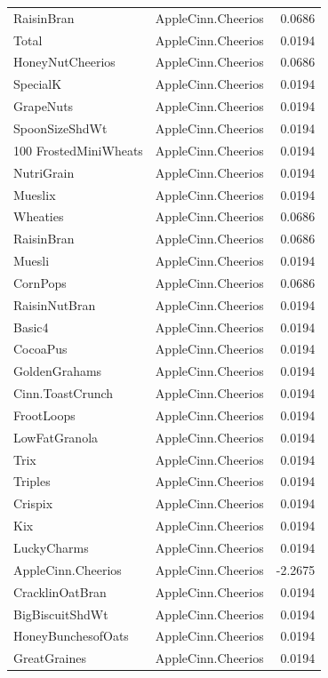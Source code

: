 \begin{longtable}{llr}
RaisinBran & AppleCinn.Cheerios & 0.0686 \\
Total & AppleCinn.Cheerios & 0.0194 \\
HoneyNutCheerios & AppleCinn.Cheerios & 0.0686 \\
SpecialK & AppleCinn.Cheerios & 0.0194 \\
GrapeNuts & AppleCinn.Cheerios & 0.0194 \\
SpoonSizeShdWt & AppleCinn.Cheerios & 0.0194 \\
100%
FrostedMiniWheats & AppleCinn.Cheerios & 0.0194 \\
NutriGrain & AppleCinn.Cheerios & 0.0194 \\
Mueslix & AppleCinn.Cheerios & 0.0194 \\
Wheaties & AppleCinn.Cheerios & 0.0686 \\
RaisinBran & AppleCinn.Cheerios & 0.0686 \\
Muesli & AppleCinn.Cheerios & 0.0194 \\
CornPops & AppleCinn.Cheerios & 0.0686 \\
RaisinNutBran & AppleCinn.Cheerios & 0.0194 \\
Basic4 & AppleCinn.Cheerios & 0.0194 \\
CocoaPus & AppleCinn.Cheerios & 0.0194 \\
GoldenGrahams & AppleCinn.Cheerios & 0.0194 \\
Cinn.ToastCrunch & AppleCinn.Cheerios & 0.0194 \\
FrootLoops & AppleCinn.Cheerios & 0.0194 \\
LowFatGranola & AppleCinn.Cheerios & 0.0194 \\
Trix & AppleCinn.Cheerios & 0.0194 \\
Triples & AppleCinn.Cheerios & 0.0194 \\
Crispix & AppleCinn.Cheerios & 0.0194 \\
Kix & AppleCinn.Cheerios & 0.0194 \\
LuckyCharms & AppleCinn.Cheerios & 0.0194 \\
AppleCinn.Cheerios & AppleCinn.Cheerios & -2.2675 \\
CracklinOatBran & AppleCinn.Cheerios & 0.0194 \\
BigBiscuitShdWt & AppleCinn.Cheerios & 0.0194 \\
HoneyBunchesofOats & AppleCinn.Cheerios & 0.0194 \\
GreatGraines & AppleCinn.Cheerios & 0.0194 \\

\end{longtable}
